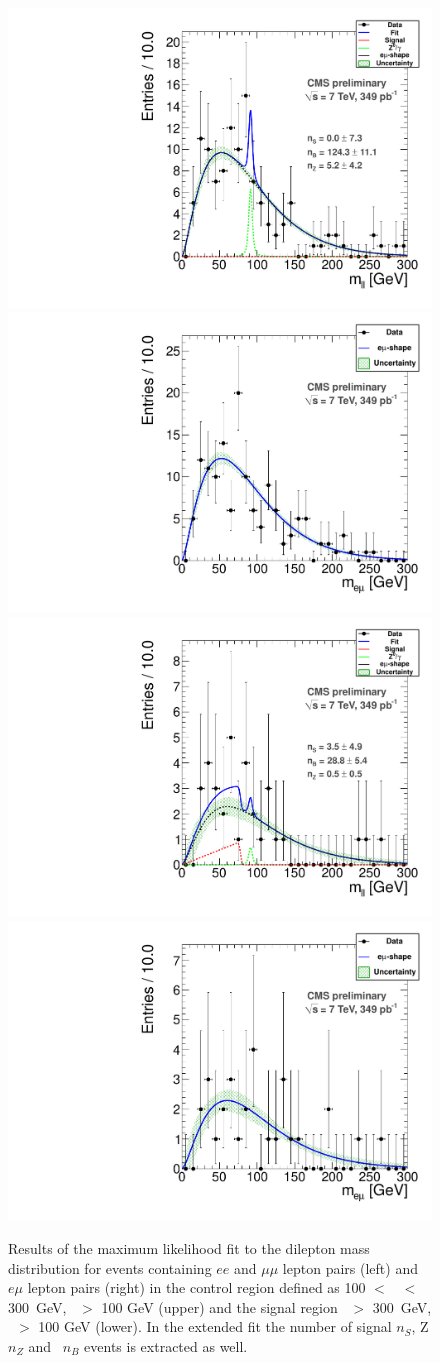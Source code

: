 \begin{figure}[hbt]
\begin{center}
\includegraphics[width=0.48\linewidth]{plots_final/fit2011_Control_Data.pdf}
\includegraphics[width=0.48\linewidth]{plots_final/fit2011OFOS_Control_Data.pdf}
\includegraphics[width=0.48\linewidth]{plots_final/fit2011_Signal_Data.pdf}
\includegraphics[width=0.48\linewidth]{plots_final/fit2011OFOS_Signal_Data.pdf}
\caption{\label{fig:dilmass}\protect 
Results of the maximum likelihood fit to the dilepton mass distribution for events containing 
$ee$ and $\mu\mu$ lepton pairs (left) and $e\mu$ lepton pairs (right) in the control
region defined as 100 $<$ \Ht\ $<$ 300~GeV, \MET\ $>$ 100 GeV (upper) and the signal region
\Ht\ $>$ 300~GeV, \MET\ $>$ 100 GeV (lower). In the extended fit the number of
signal $n_{S}$, Z $n_Z$ and \ttbar\ $n_B$ events is extracted as well.
}
\end{center}
\end{figure}

